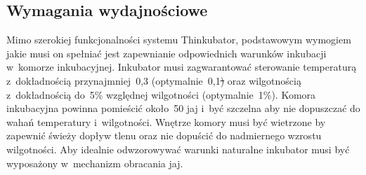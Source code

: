 \subsection{Wymagania wydajnościowe}
Mimo szerokiej funkcjonalności systemu Thinkubator, podstawowym wymogiem jakie
musi on spełniać jest zapewnianie odpowiednich warunków inkubacji w~komorze
inkubacyjnej. Inkubator musi zagwarantować sterowanie temperaturą z~dokładnością
przynajmniej~0,3\st{} (optymalnie~0,1\st) oraz wilgotnością z~dokładnością do~5\%
względnej wilgotności (optymalnie~1\%). Komora inkubacyjna powinna pomieścić
około~50 jaj i~być szczelna aby nie dopuszczać do wahań temperatury i~wilgotności.
Wnętrze komory musi być wietrzone by zapewnić świeży dopływ tlenu
oraz nie dopuścić do nadmiernego wzrostu wilgotności. Aby idealnie odwzorowywać
warunki naturalne inkubator musi być wyposażony w~mechanizm obracania jaj.
